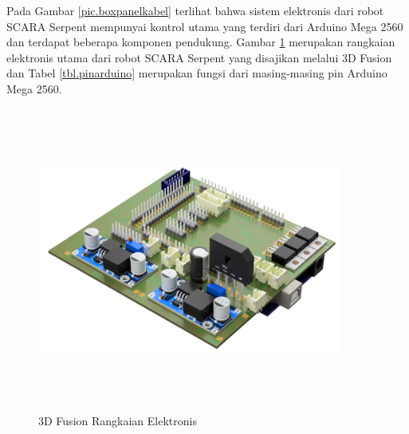 Pada Gambar \ref{pic.boxpanelkabel} terlihat bahwa sistem elektronis dari robot SCARA Serpent mempunyai kontrol utama yang terdiri dari Arduino Mega 2560 dan terdapat beberapa komponen pendukung. Gambar \ref{pic.sisminarduino} merupakan rangkaian elektronis utama dari robot SCARA Serpent yang disajikan melalui 3D Fusion dan Tabel \ref{tbl.pinarduino} merupakan fungsi dari masing-masing pin Arduino Mega 2560.
\begin{figure}[H]
	\centering
	\includegraphics[width=10cm, height=10cm]{gambar/fusion.png}
	\caption{3D Fusion Rangkaian Elektronis}
	\label{pic.sisminarduino}
\end{figure}

